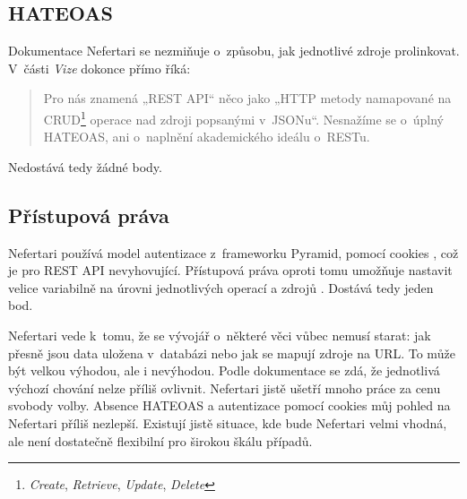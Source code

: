 \subsection{HATEOAS}\label{hateoas}

Dokumentace Nefertari se nezmiňuje o~způsobu, jak jednotlivé zdroje prolinkovat. V~části \emph{Vize} \autocite{nefertarivision} dokonce přímo říká:

\begin{quote}
Pro nás znamená „REST API“ něco jako „HTTP metody namapované na CRUD\footnote{\emph{Create}, \emph{Retrieve}, \emph{Update}, \emph{Delete}} operace nad zdroji popsanými v~JSONu“. Nesnažíme se o~úplný HATEOAS, ani o~naplnění akademického ideálu o~RESTu.
\end{quote}

Nedostává tedy žádné body.

\subsection{Přístupová práva}\label{pux159uxedstupovuxe1-pruxe1va}

Nefertari používá model autentizace z~frameworku Pyramid, pomocí cookies \autocite{nefertariauth}, což je pro REST API nevyhovující. Přístupová práva oproti tomu umožňuje nastavit velice variabilně na úrovni jednotlivých operací a zdrojů \autocite{nefertariauth}. Dostává tedy jeden bod.

Nefertari vede k~tomu, že se vývojář o~některé věci vůbec nemusí starat: jak přesně jsou data uložena v~databázi nebo jak se mapují zdroje na URL. To může být velkou výhodou, ale i nevýhodou. Podle dokumentace se zdá, že jednotlivá výchozí chování nelze příliš ovlivnit. Nefertari jistě ušetří mnoho práce za cenu svobody volby. Absence HATEOAS a autentizace pomocí cookies můj pohled na Nefertari příliš nezlepší. Existují jistě situace, kde bude Nefertari velmi vhodná, ale není dostatečně flexibilní pro širokou škálu případů.
